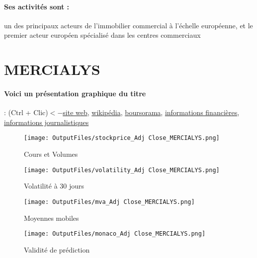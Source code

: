 \documentclass[11pt,a4paper]{report}%
\begin{document}
\paragraph{Ses activités sont : } un des principaux acteurs de l'immobilier commercial à l'échelle européenne, et le premier acteur européen spécialisé dans les centres commerciaux 
    
    \newpage

\section{MERCIALYS}

\paragraph{Voici un présentation graphique du titre} : (Ctrl + Clic)$<-$\href{https://www.mercialys.fr/investisseurs/actualites-et-communiques/communiques-financiers}{site web}, \href{https://fr.wikipedia.org/wiki/Mercialys}{wikipédia}, \href{https://www.boursorama.com/cours/1rPMERY}{boursorama}, \href{https://www.qwant.com/?q=site:https:%2f%2fwww.easybourse.com%2faction-societe%2fMERCIALYS&t=web&client=ext-firefox-hp}{informations financières}, \href{https://bourse.lerevenu.com/cours-de-bourse/fiche-valeur-synthese/MERCIALYS/MERY-FR}{informations journalistiques}
\begin{figure}[!htb]
   \begin{minipage}{0.5\textwidth}
     \centering
     \texttt{[image: OutputFiles/stockprice\_Adj Close\_MERCIALYS.png]}
     \caption{Cours et Volumes}\label{Fig:price_MERCIALYS}
   \end{minipage}\hfill
   \begin{minipage}{0.5\textwidth}
     \centering
     \texttt{[image: OutputFiles/volatility\_Adj Close\_MERCIALYS.png]}
     \caption{Volatilité à 30 jours}\label{Fig:volat_MERCIALYS}
   \end{minipage}
\end{figure}
\begin{figure}[!htb]
   \begin{minipage}{0.5\textwidth}
     \centering
     \texttt{[image: OutputFiles/mva\_Adj Close\_MERCIALYS.png]}
     \caption{Moyennes mobiles}\label{Fig:mva_MERCIALYS}
   \end{minipage}\hfill
   \begin{minipage}{0.5\textwidth}
     \centering
     \texttt{[image: OutputFiles/monaco\_Adj Close\_MERCIALYS.png]}
     \caption{Validité de prédiction}\label{Fig:prediction_MERCIALYS}
   \end{minipage}
\end{figure}
\end{document}
